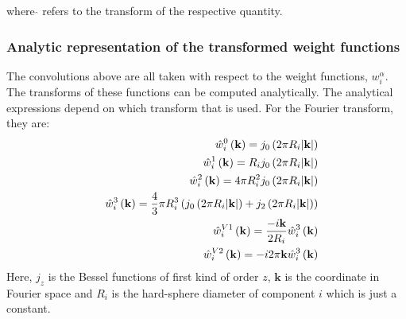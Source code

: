 \documentclass[12pt, letterpaper]{article}
\newcommand*{\lb}{\ensuremath{\left(}}
\newcommand*{\rb}{\ensuremath{\right)}}
\begin{document}
where $\hat{}$ refers to the transform of the respective quantity.

\subsubsection{Analytic representation of the transformed weight functions}
The convolutions above are all taken with respect to the weight functions, $w_i^\alpha$. The transforms of these functions can be computed analytically. The analytical expressions depend on which transform that is used. For the Fourier transform, they are:
\begin{eqnarray}
 &&\hat{w}_i^0\lb\mathbf{k}\rb=j_0\left(2\pi R_i|\mathbf{k}|\right) \label{eq:af1}\\
 &&\hat{w}_i^1\lb\mathbf{k}\rb= R_ij_0\left(2\pi R_i|\mathbf{k}|\right)\\
 &&\hat{w}_i^2\lb\mathbf{k}\rb= 4\pi R_i^2j_0\left(2\pi R_i|\mathbf{k}|\right)\\
 &&\hat{w}_i^3\lb\mathbf{k}\rb= \frac{4}{3}\pi R_i^3\left(j_0\left(2\pi R_i|\mathbf{k}|\right)+j_2\left(2\pi R_i|\mathbf{k}|\right) \right)\\
 &&\hat{w}_i^{V1}\lb\mathbf{k}\rb= \frac{-i\mathbf{k}}{2R_i}\hat{w}_i^3\lb\mathbf{k}\rb\\
 &&\hat{w}_i^{V2}\lb\mathbf{k}\rb=-i2\pi\mathbf{k}\hat{w}_i^3\lb\mathbf{k}\rb \label{eq:afN}
\end{eqnarray}
Here, $j_z$ is the Bessel functions of first kind of order $z$, $\mathbf{k}$ is the coordinate in Fourier space and $R_i$ is the hard-sphere diameter of component $i$ which is just a constant.
\end{document}
